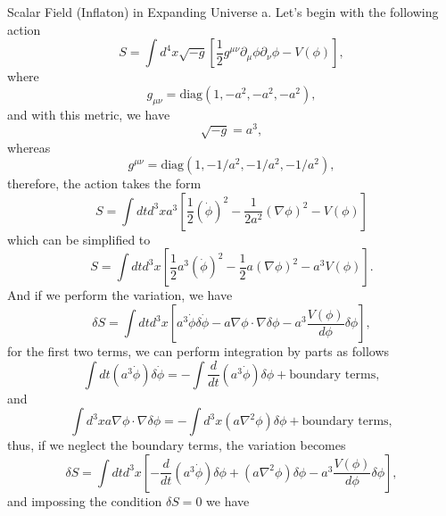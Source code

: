 \documentclass[11pt]{article}
\begin{document}
\begin{problem}
Scalar Field (Inflaton) in Expanding Universe
\newline
a. Let's begin with the following action
\begin{displaymath}
  S = \int d^4x \sqrt{-g}\left[\frac{1}{2} g^{\mu\nu}\partial_\mu\phi\partial_\nu\phi -V(\phi)\right],
\end{displaymath}
where 
\begin{displaymath}
  g_{\mu\nu}=\text{diag}(1,-a^2,-a^2,-a^2),
\end{displaymath}
and with this metric, we have
\begin{displaymath}
\sqrt{-g}=a^3,
\end{displaymath}
whereas 
\begin{displaymath}
  g^{\mu\nu} = \text{diag}(1,-1/a^2,-1/a^2,-1/a^2),
\end{displaymath}
therefore, the action takes the form
\begin{displaymath}
S = \int dt d^3x a^3\left[\frac{1}{2}(\dot\phi)^2 - \frac{1}{2a^2}(\nabla\phi)^2-V(\phi) \right]
\end{displaymath}
which can be simplified to
\begin{displaymath}
S = \int dt d^3x \left[\frac{1}{2}a^3(\dot\phi)^2 - \frac{1}{2}a(\nabla\phi)^2- a^3V(\phi) \right].
\end{displaymath}
And if we perform the variation, we have
\begin{displaymath}
  \delta S = \int dt d^3x \left[a^3\dot\phi\delta\dot\phi - a\nabla\phi\cdot\nabla\delta\phi - a^3 \frac{V(\phi)}{d\phi}\delta\phi \right],
\end{displaymath}
for the first two terms, we can perform integration by parts as follows
\begin{displaymath}
\int dt(a^3 \dot\phi)\delta\dot\phi = -\int\frac{d}{dt}\left(a^3\dot\phi\right)\delta\phi + \text{boundary terms},
\end{displaymath}
and 
\begin{displaymath}
\int d^3x a\nabla\phi\cdot\nabla\delta\phi = -\int d^3x (a\nabla^2\phi)\delta\phi + \text{boundary terms},
\end{displaymath}
thus, if we neglect the boundary terms, the variation becomes
\begin{displaymath}
  \delta S = \int dt d^3x\left[-\frac{d}{dt}\left(a^3\dot\phi\right)\delta\phi + (a\nabla^2\phi)\delta\phi - a^3 \frac{V(\phi)}{d\phi}\delta\phi\right],
\end{displaymath}
and impossing the condition $\delta S=0$ we have

\end{problem}
\end{document}

